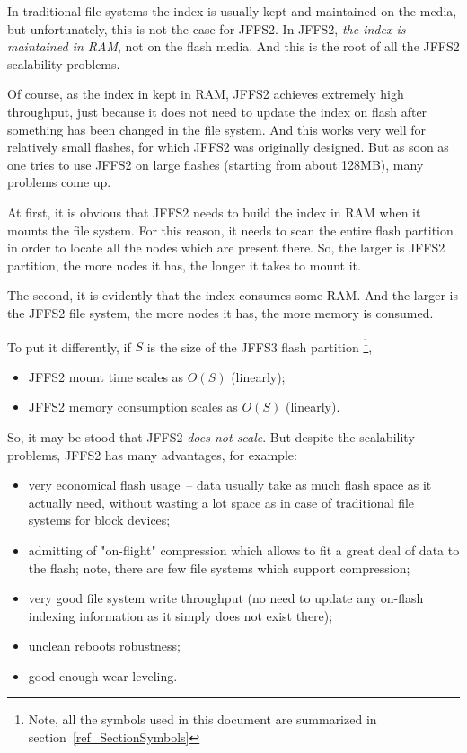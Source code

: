 In traditional file systems the index is usually kept and maintained
on the media, but unfortunately, this is not the case for JFFS2.
In JFFS2, \emph{the index is maintained in RAM}, not on the flash media.
And this is the root of all the JFFS2 scalability problems.

Of course, as the index in kept in RAM, JFFS2 achieves extremely high
throughput, just because it does not need to update the index on flash after
something has been changed in the file system. And this works very well for
relatively small flashes, for which JFFS2 was originally designed. But as soon
as one tries to use JFFS2 on large flashes (starting from about 128MB), many
problems come up.

At first, it is obvious that JFFS2 needs to build the index in RAM when it
mounts the file system. For this reason, it needs to scan the entire flash
partition in order to locate all the nodes which are present there. So, the
larger is JFFS2 partition, the more nodes it has, the longer it takes to mount
it.

The second, it is evidently that the index consumes some RAM. And the larger is
the JFFS2 file system, the more nodes it has, the more memory is consumed.

To put it differently, if $S$ is the size of the JFFS3 flash partition
\footnote{Note, all the symbols used in this document are summarized in
section~\ref{ref_SectionSymbols}},

\begin{itemize}

\item JFFS2 mount time scales as $O(S)$ (linearly);

\item JFFS2 memory consumption scales as $O(S)$ (linearly).

\end{itemize}

So, it may be stood that JFFS2 \emph{does not scale}. But despite the
scalability problems, JFFS2 has many advantages, for example:

\begin{itemize}

\item very economical flash usage~-- data usually take as much flash
space as it actually need, without wasting a lot space as in case of
traditional file systems for block devices;

\item admitting of "\mbox{on-flight}" compression which allows to fit a great
deal of data to the flash; note, there are few file systems which support
compression;

\item very good file system write throughput (no need to update any
\mbox{on-flash} indexing information as it simply does not exist there);

\item unclean reboots robustness;

\item good enough \mbox{wear-leveling}.

\end{itemize}

